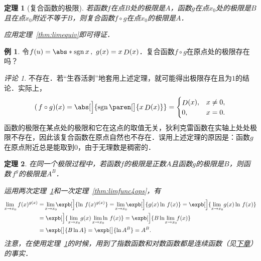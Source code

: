 \documentclass[a4paper,punct=CCT]{ctexbook}
\makeatletter
\newtheorem{theorem}{定理}
\theoremstyle{definition}
\newtheorem*{example*}{例}
\theoremstyle{remark}
\newtheorem*{remark}{评论}
\renewcommand*{\proofname}{证}
\renewenvironment{proof}[1][\proofname]{\par
  \pushQED{\qed}%
  \normalfont \topsep6\p@\@plus6\p@\relax
  \trivlist
  \item[\hskip\labelsep
    \bfseries
    #1%
    ]\ignorespaces
}{%
  \popQED\endtrivlist\@endpefalse
}
\makeatother
\begin{document}
\begin{theorem}[复合函数的极限]
  \label{thm:limfunccomp}
  若函数\(f\)在点\(B\)处的极限是\(A\)，函数\(g\)在点\(x_0\)处的极限是\(B\)且在点\(x_0\)附近不等于\(B\)，则复合函数\(f \circ g\)在点\(x_0\)的极限是\(A\)．

  \begin{proof}
    应用定理~\ref{thm:limequiv}即可得证．
  \end{proof}
\end{theorem}

\begin{example*}
  令\(f(u) = \abs*{\sgn x}\,,\ g(x) = x \Fn D(x)\)．复合函数\(f \circ g\)在原点处的极限存在吗？

  \begin{remark}
    不存在．若“生吞活剥”地套用上述定理，就可能得出极限存在且为\(1\)的结论．实际上，
    \begin{equation*}
      (\,f \circ g)(x)
      = \abs[\Big]{\sgn\paren[\big]{x \Fn D(x)}} =
      \begin{cases}
        \Fn D(x), & x \ne 0, \\
        0, & x = 0.
      \end{cases}
    \end{equation*}
    函数的极限在某点处的极限和它在这点的取值无关，狄利克雷函数在实轴上处处极限不存在，因此该复合函数在原点自然也不存在．误用上述定理的原因是：函数\(g\)在原点附近总是能取到\(0\)，由于无理数是稠密的．
  \end{remark}
\end{example*}

\begin{theorem}
  \label{thm:limfuncpowexp}
  在同一个极限过程中，若函数\(f\)的极限是正数\(A\)且函数\(g\!\)的极限是\(B\)，则函数\(\,f^g\!\)的极限是\(A^B\)．

  \begin{proof}
    运用两次定理~\ref{thm:limfunccomp}和一次定理~\ref{thm:limfunc4ops}，有
    \begin{align*}
      \lim_{x \to x_0\!} \,f(x)^{g(x)}
      &= {}\smashoperator{\lim_{x \to x_0\!}} \expb[\Big]{\ln \,f(x)^{g(x)}}
        = {}\smashoperator{\lim_{x \to x_0\!}} \expb[\Big]{g(x) \ln \,f(x)}
        = \expb[\Big]{\lim_{x \to x_0\!} g(x) \ln \,f(x)} \\
      &= \expb[\Big]{\lim_{x \to x_0\!} g(x) \smashoperator[r]{\lim_{x \to x_0\!}} \ln \,f(x)}
        = \expb[\Big]{B \ln {}\smashoperator{\lim_{x \to x_0\!}} \,f(x)} \\
      &= \expb[\big]{B \ln A} = \expb[\big]{\ln A^B} = A^B.
    \end{align*}
    注意，在使用定理~\ref{thm:limfunccomp}的时候，用到了指数函数和对数函数都是连续函数（见\hyperref[chap:cont]{下章}）的事实．
  \end{proof}
\end{theorem}
\end{document}
